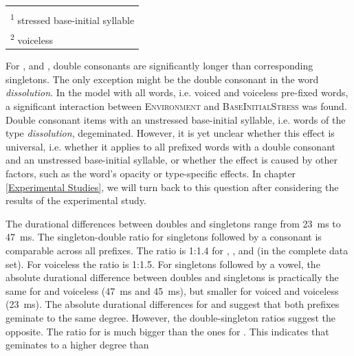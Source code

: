 \begin{table}[!t]
\begin{center}
{\begin{tabular} {lcccc}
			
			\hline
			\\

			\multicolumn{5}{l}{\textsuperscript{1} \footnotesize{stressed base-initial syllable}}\\
			\multicolumn{5}{l}{\textsuperscript{2} \footnotesize{voiceless}}\\

		\end{tabular}
	}
	\end{center}
	

	
\end{table}


For ,  and , double consonants are significantly longer than corresponding singletons. The only exception might be the double consonant in the word \textit{dissolution}. In the model with all words, i.e. voiced and voiceless pre-fixed words, a significant interaction between \textsc{Environment} and \textsc{BaseInitialStress} was found. Double consonant items with an unstressed base-initial syllable, i.e. words of the type \textit{dissolution}, degeminated. However, it is yet unclear whether this effect is universal, i.e. whether it applies to all prefixed words with a double consonant and an unstressed base-initial syllable,  or whether the effect is caused by other factors, such as the word's opacity or type-specific effects. In chapter \ref{Experimental Studies}, we will turn back to this question after considering the results of the experimental study.

The durational differences between doubles and singletons range from 23~ms to 47~ms.  The singleton-double ratio for singletons followed by a consonant is comparable across all prefixes. The ratio is 1:1.4 for , , and  (in the complete data set). For voiceless  the ratio is 1:1.5.
For singletons followed by a vowel, the absolute durational difference between doubles and singletons is practically the same for  and voiceless  (47~ms and 45~ms), but smaller for voiced and voiceless  (23~ms). The absolute durational differences for  and  suggest that both prefixes geminate to the same degree. However, the double-singleton ratios suggest the opposite. The ratio for  is much bigger than the ones for . This indicates that  geminates to a higher degree than 


